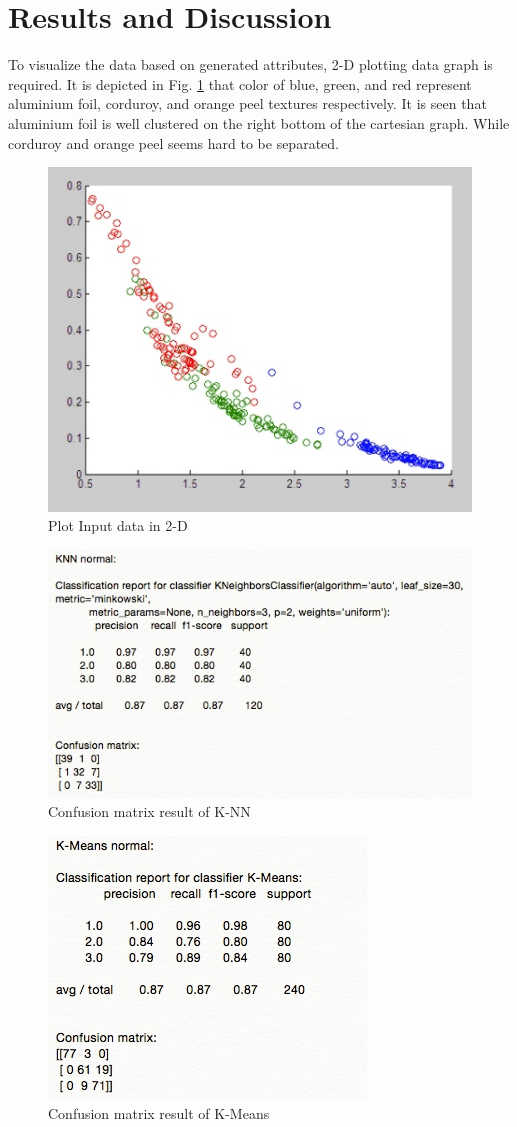 \documentclass[conference]{IEEEtran}
\begin{document}
\section{Results and Discussion}

To visualize the data based on generated attributes, 2-D plotting data graph is required. It is depicted in Fig. \ref{fig:plotinputdata} that color of blue, green, and red represent aluminium foil, corduroy, and orange peel textures respectively. It is seen that aluminium foil is well clustered on the right bottom of the cartesian graph. While corduroy and orange peel seems hard to be separated. 

\begin{figure}[!t]
\centering
\includegraphics[width=2.8 in]{plot_data_tugas.jpg}
\caption{Plot Input data in 2-D}
\label{fig:plotinputdata}
\end{figure}

\begin{figure}[!t]
\centering
\includegraphics[width=3.2 in]{confmat_knn.jpg}
\caption{Confusion matrix result of K-NN}
\label{fig:confmatrix-knn}
\end{figure}

\begin{figure}[!t]
\centering
\includegraphics[width=2.1 in]{confmat_k-means.jpg}
\caption{Confusion matrix result of K-Means}
\label{fig:confmatrix-k-means}
\end{figure}
\end{document}
